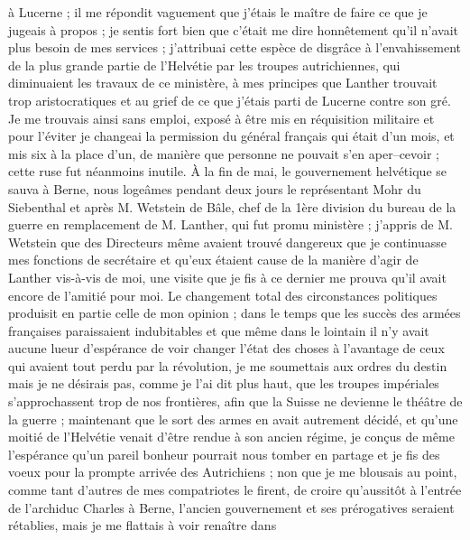\documentclass[12pt]{article}
\begin{document}
à Lucerne ; il me répondit vaguement que j’étais le maître de faire ce que je jugeais à propos ; je
sentis fort bien que c’était me dire honnêtement qu’il n’avait plus besoin de mes services ;
j’attribuai cette espèce de disgrâce à l’envahissement de la plus grande partie de l’Helvétie par
les troupes autrichiennes, qui diminuaient les travaux de ce ministère, à mes principes que Lanther
trouvait trop aristocratiques et au grief de ce que j’étais parti de Lucerne contre son gré. Je me
trouvais ainsi sans emploi, exposé à être mis en réquisition militaire et pour l’éviter je changeai
la permission du général français qui était d’un mois, et mis six à la place d’un, de manière que
personne ne pouvait s’en aper–cevoir ; cette ruse fut néanmoins inutile. À la fin de mai, le
gouvernement helvétique se sauva à Berne, nous logeâmes pendant deux jours le représentant Mohr du
Siebenthal et après M. Wetstein de Bâle, chef de la 1ère division du bureau de la guerre en
remplacement de M. Lanther, qui fut promu ministère ; j’appris de M. Wetstein que des Directeurs
même avaient trouvé dangereux que je continuasse mes fonctions de secrétaire et qu’eux étaient cause
de la manière d’agir de Lanther vis-à-vis de moi, une visite que je fis à ce dernier me prouva qu’il
avait encore de l’amitié pour moi. Le changement total des circonstances politiques produisit en
partie celle de mon opinion ; dans le temps que les succès des armées françaises paraissaient
indubitables et que même dans le lointain il n’y avait aucune lueur d’espérance de voir changer
l’état des choses à l’avantage de ceux qui avaient tout perdu par la révolution, je me soumettais
aux ordres du destin mais je ne désirais pas, comme je l’ai dit plus haut, que les troupes
impériales s’approchassent trop de nos frontières, afin que la Suisse ne devienne le théâtre de la
guerre ; maintenant que le sort des armes en avait autrement décidé, et qu’une moitié de l’Helvétie
venait d’être rendue à son ancien régime, je conçus de même l’espérance qu’un pareil bonheur
pourrait nous tomber en partage et je fis des voeux pour la prompte arrivée des Autrichiens ; non
que je me blousais au point, comme tant d’autres de mes compatriotes le firent, de croire
qu’aussitôt à l’entrée de l’archiduc Charles à Berne, l’ancien gouvernement et ses prérogatives
seraient rétablies, mais je me flattais à voir renaître dans
\end{document}
